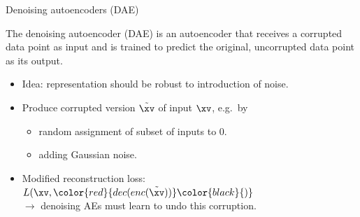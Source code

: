 \documentclass[11pt,compress,t,notes=noshow, xcolor=table]{beamer}
\begin{document}
\begin{vbframe}{Denoising autoencoders (DAE)}

The denoising autoencoder (DAE) is an autoencoder that receives a corrupted data point as input and is trained to predict the original, uncorrupted data point as its output.

    \begin{itemize}
       \item Idea: representation should be robust to introduction of noise.
       \item Produce corrupted version $\tilde{\xv} $ of  input $\xv$, e.g.~by
     \begin{itemize}  
        \item random assignment of subset of inputs to 0.
      \item adding Gaussian noise.
       \end{itemize}
        \item Modified reconstruction loss: $L(\xv, \color{red}{dec(enc(\tilde{\xv}))}\color{black}{)}$ \\ %
           $\rightarrow$ denoising AEs must learn to undo this corruption.
    \end{itemize}
  
\framebreak


\end{vbframe}
\end{document}
